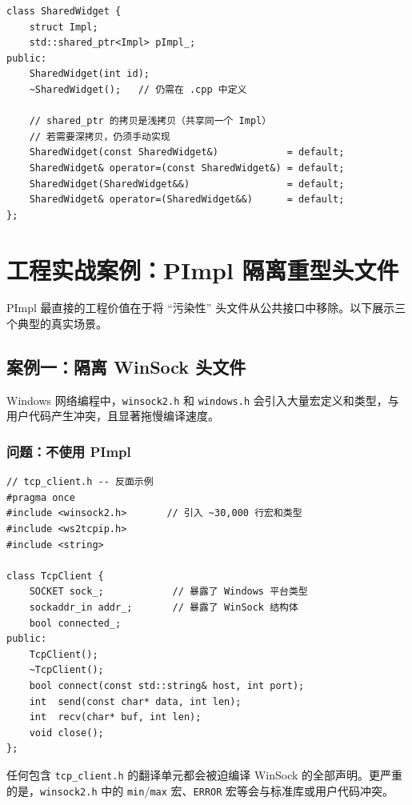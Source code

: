 \documentclass[12pt,a4paper,fontset=fandol]{ctexbook}
\begin{document}
\begin{lstlisting}[caption={PImpl shared\_ptr 版（浅拷贝）}]
class SharedWidget {
    struct Impl;
    std::shared_ptr<Impl> pImpl_;
public:
    SharedWidget(int id);
    ~SharedWidget();   // 仍需在 .cpp 中定义

    // shared_ptr 的拷贝是浅拷贝（共享同一个 Impl）
    // 若需要深拷贝，仍须手动实现
    SharedWidget(const SharedWidget&)            = default;
    SharedWidget& operator=(const SharedWidget&) = default;
    SharedWidget(SharedWidget&&)                 = default;
    SharedWidget& operator=(SharedWidget&&)      = default;
};
\end{lstlisting}

\section{工程实战案例：PImpl 隔离重型头文件}

PImpl 最直接的工程价值在于将 ``污染性'' 头文件从公共接口中移除。以下展示三个典型的真实场景。

\subsection{案例一：隔离 WinSock 头文件}

Windows 网络编程中，\texttt{winsock2.h} 和 \texttt{windows.h} 会引入大量宏定义和类型，与用户代码产生冲突，且显著拖慢编译速度。

\subsubsection*{问题：不使用 PImpl}

\begin{lstlisting}[caption={网络类——头文件直接包含 WinSock（反面示例）}]
// tcp_client.h -- 反面示例
#pragma once
#include <winsock2.h>       // 引入 ~30,000 行宏和类型
#include <ws2tcpip.h>
#include <string>

class TcpClient {
    SOCKET sock_;            // 暴露了 Windows 平台类型
    sockaddr_in addr_;       // 暴露了 WinSock 结构体
    bool connected_;
public:
    TcpClient();
    ~TcpClient();
    bool connect(const std::string& host, int port);
    int  send(const char* data, int len);
    int  recv(char* buf, int len);
    void close();
};
\end{lstlisting}

任何包含 \texttt{tcp\_client.h} 的翻译单元都会被迫编译 WinSock 的全部声明。更严重的是，\texttt{winsock2.h} 中的 \texttt{min}/\allowbreak{}\texttt{max} 宏、\texttt{ERROR} 宏等会与标准库或用户代码冲突。
\end{document}
